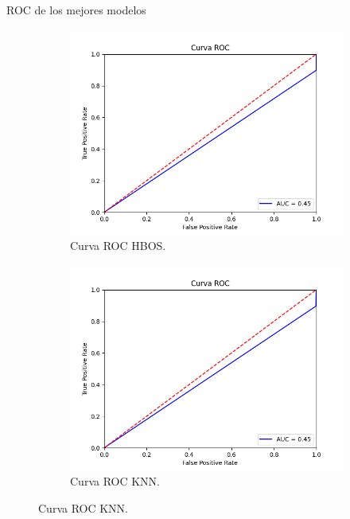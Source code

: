 \documentclass[10pt]{beamer}
\begin{document}
\begin{frame}[fragile]{ROC de los mejores modelos}
	\pause
	
	\begin{figure}[H]
		\centering
		\begin{subfigure}{.49\textwidth}
			\centering
			\includegraphics[scale=0.27]{Imagenes/HBOS_roc.png}
			\caption{Curva ROC HBOS.}
		\end{subfigure}
		\begin{subfigure}{.49\textwidth}
			\centering
			\includegraphics[scale=0.27]{Imagenes/KNN_roc.png}
			\caption{Curva ROC KNN.}
		\end{subfigure}
	\end{figure}


\end{frame}
\end{document}

